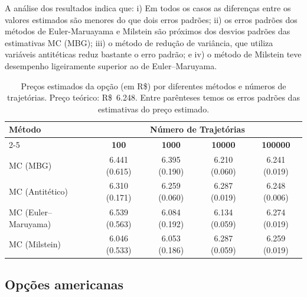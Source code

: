 \documentclass[12pt,openright,oneside,a4paper]{abntex2}
\numberwithin{equation}{section}
\begin{document}
A análise dos resultados indica que: i) Em todos os casos as diferenças entre os valores estimados são menores do que dois erros padrões; ii) os erros padrões dos métodos de Euler-Maruayama e Milstein são próximos dos desvios padrões das estimativas  MC (MBG); iii)   o método de redução de variância, que utiliza variáveis antitéticas reduz bastante o erro padrão; e iv) o método de  Milstein teve desempenho ligeiramente superior ao de Euler–Maruyama.



\begin{table}[H]
\centering
\scriptsize
\caption{
Preços estimados da opção (em R\$) por diferentes métodos e números de trajetórias. Preço teórico: R\$~6{.}248. Entre parênteses temos os erros padrões das estimativas do preço estimado.
}
\vspace{0.5em}
\begin{tabular}{|l|c|c|c|c|}
\hline
\textbf{Método} & \multicolumn{4}{c|}{\textbf{Número de Trajetórias}} \\
\cline{2-5}
                & \textbf{100} & \textbf{1000} & \textbf{10000} & \textbf{100000} \\
\hline
MC (MBG)                  & 6{.}441  (0{.}615) & 6{.}395 (0{.}190) & 6{.}210 (0{.}060) & 6{.}241  (0{.}019) \\
MC (Antitético)           & 6{.}310 (0{.}171) & 6{.}259 (0{.}060) & 6{.}287 (0{.}019) & 6{.}248  (0{.}006) \\
MC (Euler–Maruyama)       & 6{.}539 (0{.}563) & 6{.}084 (0{.}192) & 6{.}134 (0{.}059) & 6{.}274  (0{.}019) \\
MC (Milstein)             & 6{.}046 (0{.}533) & 6{.}053 (0{.}186) & 6{.}287 (0{.}059) & 6{.}259 (0{.}019) \\
\hline
\end{tabular}
\label{tab:precos_metodos_1000passos}
\end{table}




\subsection{Opções americanas }
\end{document}
